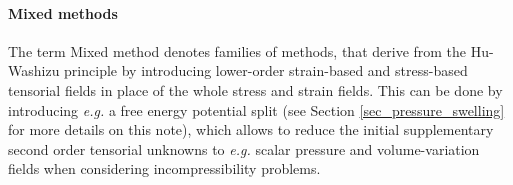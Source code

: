 
\paragraph{Mixed methods}

The term Mixed method denotes families of methods, that derive from the Hu-Washizu principle by introducing
lower-order strain-based and stress-based tensorial fields
in place of the whole stress and strain fields. This can be done by introducing
\textit{e.g.} a free energy potential split \cite{malkus_mixed_1978, al-akhrass_methodes_nodate}
(see Section \ref{sec_pressure_swelling} for more details on this note),
which allows to reduce the initial supplementary second order tensorial unknowns to \textit{e.g.} scalar pressure
and volume-variation fields when considering incompressibility problems.



